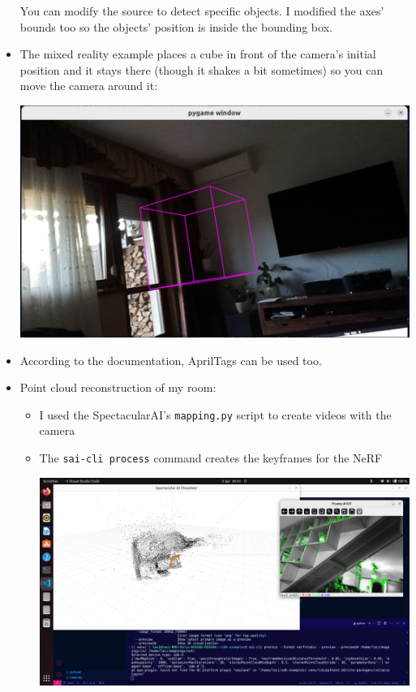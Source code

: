 \documentclass{article}
\begin{document}
\begin{itemize}
\begin{minipage}{\linewidth}
    \end{minipage}\par
    You can modify the source to detect specific objects. I modified the axes' bounds too so the objects' position is inside the bounding box.
    \item The mixed reality example places a cube in front of the camera's initial position and it stays there (though it shakes a bit sometimes) so you can move the camera around it:\par
    \begin{minipage}{\linewidth}
        \centering
        \includegraphics[width=1\linewidth]{images/spectacular_ai_mixed_reality.png}
    \end{minipage}\par
    \item According to the documentation, AprilTags can be used too.
    \item Point cloud reconstruction of my room:
    \begin{itemize}
        \item I used the SpectacularAI's \verb|mapping.py| script to create videos with the camera
        \item The \verb|sai-cli process| command creates the keyframes for the NeRF\par
        \begin{minipage}{\linewidth}
            \centering
            \includegraphics[width=1\linewidth]{images/sai-cli_process.png}

\end{minipage}
\end{itemize}
\end{itemize}
\end{document}

